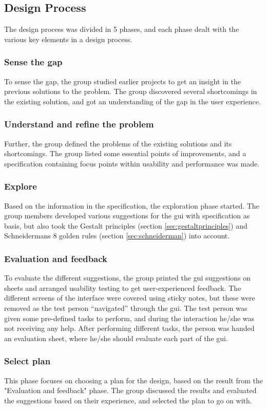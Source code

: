 \subsection{Design Process}
\label{sec:hcimethod}
The design process was divided in 5 phases, and each phase dealt with the various key elements in a design process.

\subsubsection{Sense the gap}
\label{sec:sensethegap}
To sense the gap, the group studied earlier projects to get an insight in the previous solutions to the problem. The group discovered several shortcomings in the existing solution, and got an understanding of the gap in the user experience.

\subsubsection{Understand and refine the problem}
Further, the group defined the problems of the existing solutions and its shortcomings. The group listed some essential points of improvements, and a specification containing focus points within usability and performance was made.

\subsubsection{Explore}
\label{sec:explore}
Based on the information in the specification, the exploration phase started. The group members developed various suggestions for the \acrshort{gui} with specification as basis, but also took the Gestalt principles (section \ref{sec:gestaltprinciples}) and Schneidermans 8 golden rules (section \ref{sec:schneiderman}) into account.

\subsubsection{Evaluation and feedback}
\label{sec:evalandfeedback}
To evaluate the different suggestions, the group printed the \acrshort{gui} suggestions on sheets and arranged usability testing to get user-experienced feedback. The different screens of the interface were covered using sticky notes, but these were removed as the test person ``navigated'' through the \acrshort{gui}. The test person was given some pre-defined tasks to perform, and during the interaction he/she was not receiving any help. After performing different tasks, the person was handed an evaluation sheet, where he/she should evaluate each part of the \acrshort{gui}.

\subsubsection{Select plan}
\label{sec:selectplan}
This phase focuses on choosing a plan for the design, based on the result from the "Evaluation and feedback" phase. The group discussed the results and evaluated the suggestions based on their experience, and selected the plan to go on with.